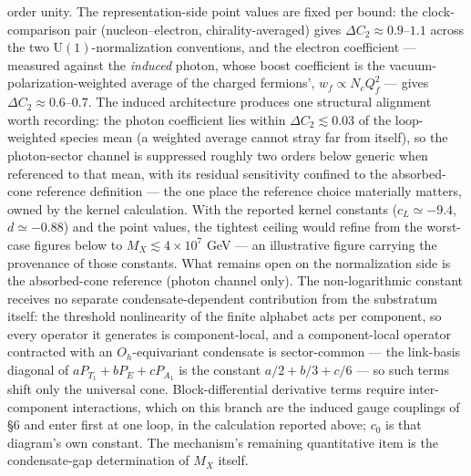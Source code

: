 \documentclass[
]{article}
\begin{document}
order unity. The representation-side point values are fixed per bound:
the clock-comparison pair (nucleon--electron, chirality-averaged) gives
\(\Delta C_2 \approx 0.9\)--\(1.1\) across the two
\(\mathrm{U}(1)\)-normalization conventions, and the electron
coefficient --- measured against the \emph{induced} photon, whose boost
coefficient is the vacuum-polarization-weighted average of the charged
fermions', \(w_f \propto N_c Q_f^2\) --- gives
\(\Delta C_2 \approx 0.6\)--\(0.7\). The induced architecture produces
one structural alignment worth recording: the photon coefficient lies
within \(\Delta C_2 \lesssim 0.03\) of the loop-weighted species mean (a
weighted average cannot stray far from itself), so the photon-sector
channel is suppressed roughly two orders below generic when referenced
to that mean, with its residual sensitivity confined to the
absorbed-cone reference definition --- the one place the reference
choice materially matters, owned by the kernel calculation. With the
reported kernel constants (\(c_L \simeq -9.4\), \(d \simeq -0.88\)) and
the point values, the tightest ceiling would refine from the worst-case
figures below to \(M_X \lesssim 4\times10^{7}\) GeV --- an illustrative
figure carrying the provenance of those constants. What remains open on
the normalization side is the absorbed-cone reference (photon channel
only). The non-logarithmic constant receives no separate
condensate-dependent contribution from the substratum itself: the
threshold nonlinearity of the finite alphabet acts per component, so
every operator it generates is component-local, and a component-local
operator contracted with an \(O_h\)-equivariant condensate is
sector-common --- the link-basis diagonal of \(aP_{T_1}+bP_E+cP_{A_1}\)
is the constant \(a/2+b/3+c/6\) --- so such terms shift only the
universal cone. Block-differential derivative terms require
inter-component interactions, which on this branch are the induced gauge
couplings of §6 and enter first at one loop, in the calculation reported
above; \(c_0\) is that diagram's own constant. The mechanism's remaining
quantitative item is the condensate-gap determination of \(M_X\) itself.
\end{document}
